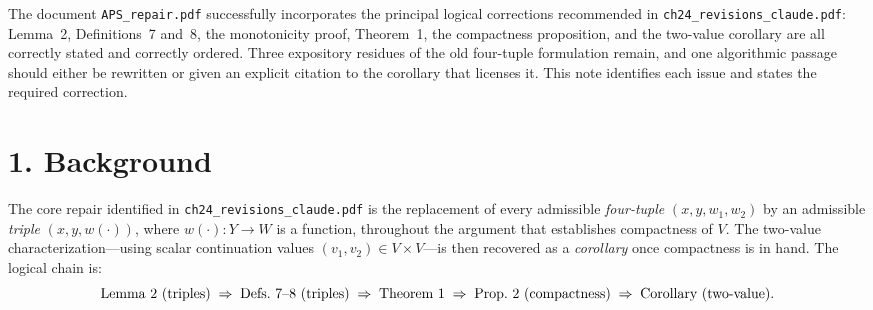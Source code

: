 


%
%
%
%
%
The document {\tt APS\_repair.pdf} successfully incorporates the principal
logical corrections recommended in {\tt ch24\_revisions\_claude.pdf}:
Lemma~2, Definitions~7 and~8, the monotonicity proof, Theorem~1, the
compactness proposition, and the two-value corollary are all correctly
stated and correctly ordered.  Three expository residues of the old
four-tuple formulation remain, and one algorithmic passage should either
be rewritten or given an explicit citation to the corollary that licenses
it.  This note identifies each issue and states the required correction.

\section{1. Background}

The core repair identified in {\tt ch24\_revisions\_claude.pdf} is the
replacement of every admissible {\it four-tuple\/} $(x,y,w_1,w_2)$ by an
admissible {\it triple\/} $(x,y,w(\cdot))$, where $w(\cdot):Y\to W$ is a
function, throughout the argument that establishes compactness of $V$.
The two-value characterization---using scalar continuation values
$(v_1,v_2)\in V\times V$---is then recovered as a {\it corollary\/} once
compactness is in hand.  The logical chain is:
$$\hbox{Lemma 2 (triples)}\;\Rightarrow\;
  \hbox{Defs.\ 7--8 (triples)}\;\Rightarrow\;
  \hbox{Theorem 1}\;\Rightarrow\;
  \hbox{Prop.\ 2 (compactness)}\;\Rightarrow\;
  \hbox{Corollary (two-value).}$$

